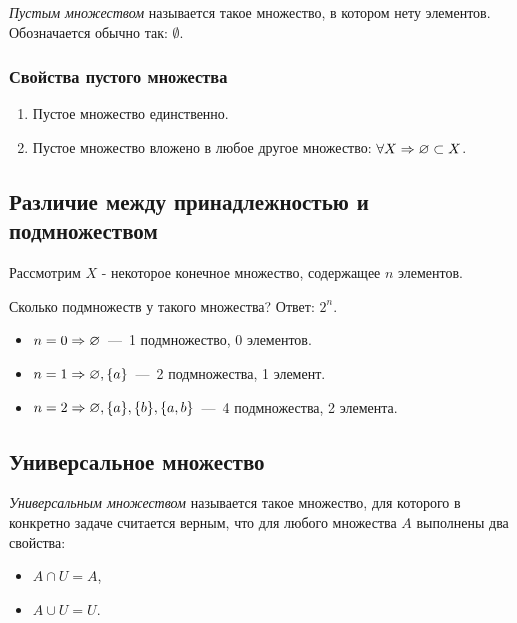 \begin{multicols}{2}
    \begin{definition}{}{}
        \textit{Пустым множеством} называется такое множество, в котором нету элементов. Обозначается обычно так: $\emptyset$.
    \end{definition}
     
    \subsubsection*{Свойства пустого множества}
     
    \begin{enumerate}
         \item Пустое множество единственно.
         \item Пустое множество вложено в любое другое множество: $\forall X \Rightarrow \varnothing \subset X$.
    \end{enumerate}
     
    \subsection*{Различие между принадлежностью и подмножеством}
     
    Рассмотрим $X$ - некоторое конечное множество, содержащее $n$ элементов.
     
    Сколько подмножеств у такого множества? Ответ: $2^n$.
     
    \begin{itemize}
         \item $n = 0 \Rightarrow \varnothing$~---~1 подмножество, 0 элементов.
         \item $n = 1 \Rightarrow \varnothing, \{a\}$~---~2 подмножества, 1 элемент.
         \item $n = 2 \Rightarrow \varnothing, \{a\}, \{b\}, \{a, b\}$~---~4 подмножества, 2 элемента.
    \end{itemize}
     
    \subsection*{Универсальное множество}
     
    \begin{definition}{}{}
        \textit{Универсальным множеством} называется такое множество, для которого в конкретно задаче считается верным, что для любого множества $A$ выполнены два свойства:
        \begin{itemize}
            \item $A \cap U = A$,
            \item $A \cup U = U$.
        \end{itemize}
    \end{definition}
     

\end{multicols}
